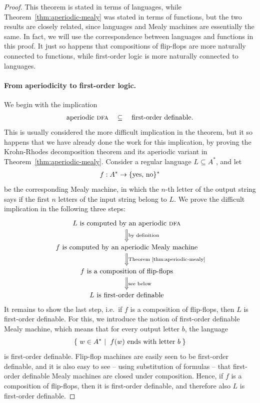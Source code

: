 \begin{proof}
    This theorem is stated in terms of languages, while Theorem~\ref{thm:aperiodic-mealy} was stated in terms of functions, but the two results are closely related, since languages and Mealy machines are essentially the same. In fact, we  will use the correspondence between languages and functions in this proof. It just so happens that compositions of flip-flops are more naturally connected to functions, while first-order logic is more naturally connected to languages. 

    \paragraph*{From aperiodicity to first-order logic.}
    We begin with the  implication 
    \begin{align*}
    \text{aperiodic \textsc{dfa}} \quad \subseteq \quad \text{first-order definable}.
    \end{align*}
    This is usually considered the more difficult implication in the theorem, but it so  happens that we have already done the  work for this implication, by proving the Krohn-Rhodes decomposition theorem and its aperiodic variant in Theorem~\ref{thm:aperiodic-mealy}.  Consider a regular language $L \subseteq A^*$, and let 
    \begin{align*}
    f : A^* \to \{\text{yes, no}\}^*
    \end{align*}
    be the corresponding Mealy machine, in which the $n$-th letter of the output string says if the first $n$ letters of the input string belong to $L$. We prove the difficult implication in the following three steps: 
    \[
    \begin{tikzcd}
    \text{$L$ is computed by an aperiodic \dfa}
    \ar[d,Rightarrow,"\text{by definition}"]
    \\ 
    \text{$f$ is computed by an aperiodic Mealy machine}
    \ar[d,Rightarrow, "\text{Theorem~\ref{thm:aperiodic-mealy}}"]
    \\
    \text{$f$ is a composition of flip-flops}
    \ar[d,Rightarrow, "\text{see below}"]
    \\
    \text{$L$ is first-order definable}
    \end{tikzcd}
    \]
    It remains to show the last step, i.e.~if $f$ is a composition of flip-flops, then $L$ is first-order definable. For this, we introduce the notion of first-order definable Mealy machine, which means that for every output letter $b$, the language 
    \begin{align*}
    \setbuild{ w \in A^*}{$f(w)$ ends with letter $b$}
    \end{align*} is first-order definable. Flip-flop machines are easily seen to be first-order definable, and it is also easy to see -- using substitution of formulas -- that first-order definable Mealy machines are closed under composition. Hence, if $f$ is a composition of flip-flops, then it is first-order definable, and therefore also $L$ is first-order definable.


\end{proof}
